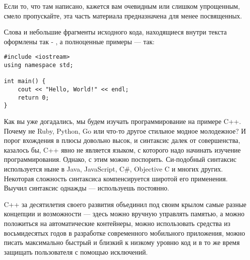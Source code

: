 \documentclass{article}
\begin{document}

Если то, что там написано, кажется вам очевидным или слишком упрощенным, смело пропускайте, эта часть материала предназначена для менее посвященных.

Слова и небольшие фрагменты исходного кода, находящиеся внутри текста оформлены так - , а полноценные примеры --- так:

\begin{lstlisting}[caption={Пример оформления кода}, captionpos=b, style=cpp]
#include <iostream>
using namespace std;

int main() {
	cout << "Hello, World!" << endl;
	return 0;
}
\end{lstlisting}

Как вы уже догадались, мы будем изучать программирование на примере C++. Почему не Ruby, Python, Go или что-то другое стильное модное молодежное? И порог вхождения в плюсы довольно высок, и синтаксис далек от совершенства, казалось бы, C++ явно не является языком, с которого надо начинать изучение программирования. Однако, с этим можно поспорить. Си-подобный синтаксис используется ныне в Java, JavaScript, C\#, Objective C и многих других. Некоторая сложность синтаксиса компенсируется широтой его применения. Выучил синтаксис однажды --- используешь постоянно.

C++ за десятилетия своего развития объединил под своим крылом самые разные концепции и возможности --- здесь можно вручную управлять памятью, а можно положиться на автоматические контейнеры, можно использовать средства из восьмидесятых годов в разработке современного мобильного приложения, можно писать максимально быстрый и близкий к низкому уровню код и в то же время защищать пользователя с помощью исключений.
\end{document}
